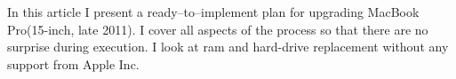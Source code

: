 In this article I present a ready--to--implement plan for upgrading MacBook Pro(15-inch, late 2011). I cover all aspects of the process so that there are no surprise during execution. I look at ram and hard-drive replacement without any support from Apple Inc.

